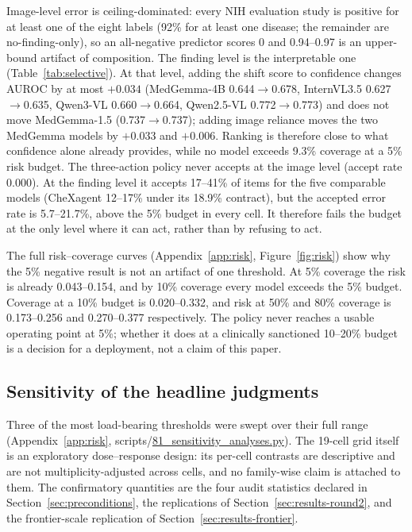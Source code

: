 Image-level error is ceiling-dominated: every NIH evaluation study is positive for at least one of the eight labels (92\% for at least one disease; the remainder are no-finding-only), so an all-negative predictor scores 0 and 0.94--0.97 is an upper-bound artifact of composition. The finding level is the interpretable one (Table~\ref{tab:selective}). At that level, adding the shift score to confidence changes AUROC by at most $+0.034$ (MedGemma-4B 0.644$\rightarrow$0.678, InternVL3.5 0.627$\rightarrow$0.635, Qwen3-VL 0.660$\rightarrow$0.664, Qwen2.5-VL 0.772$\rightarrow$0.773) and does not move MedGemma-1.5 (0.737$\rightarrow$0.737); adding image reliance moves the two MedGemma models by $+0.033$ and $+0.006$. Ranking is therefore close to what confidence alone already provides, while no model exceeds 9.3\% coverage at a 5\% risk budget. The three-action policy never accepts at the image level (accept rate 0.000). At the finding level it accepts 17--41\% of items for the five comparable models (CheXagent 12--17\% under its 18.9\% contract), but the accepted error rate is 5.7--21.7\%, above the 5\% budget in every cell. It therefore fails the budget at the only level where it can act, rather than by refusing to act.

The full risk--coverage curves (Appendix~\ref{app:risk}, Figure~\ref{fig:risk}) show why the 5\% negative result is not an artifact of one threshold. At 5\% coverage the risk is already 0.043--0.154, and by 10\% coverage every model exceeds the 5\% budget. Coverage at a 10\% budget is 0.020--0.332, and risk at 50\% and 80\% coverage is 0.173--0.256 and 0.270--0.377 respectively. The policy never reaches a usable operating point at 5\%; whether it does at a clinically sanctioned 10--20\% budget is a decision for a deployment, not a claim of this paper.




\subsection{Sensitivity of the headline judgments}
\label{sec:sensitivity}

Three of the most load-bearing thresholds were swept over their full range (Appendix~\ref{app:risk}, scripts/\url{81_sensitivity_analyses.py}). The 19-cell grid itself is an exploratory dose--response design: its per-cell contrasts are descriptive and are not multiplicity-adjusted across cells, and no family-wise claim is attached to them. The confirmatory quantities are the four audit statistics declared in Section~\ref{sec:preconditions}, the replications of Section~\ref{sec:results-round2}, and the frontier-scale replication of Section~\ref{sec:results-frontier}.


